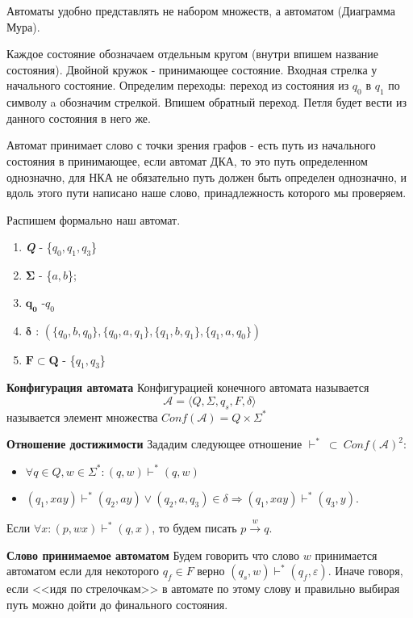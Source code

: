 Автоматы удобно представлять не набором множеств, а автоматом (Диаграмма Мура).

Каждое состояние обозначаем отдельным кругом (внутри впишем название состояния). Двойной кружок - принимающее состояние. Входная стрелка у начального состояние. Определим переходы: переход из состояния из $q_0$ в $q_1$ по символу a обозначим стрелкой. Впишем обратный переход. Петля будет вести из данного состояния в него же.

Автомат принимает слово с точки зрения графов - есть путь из начального состояния в принимающее, если автомат ДКА, то это путь определенном однозначно, для НКА не обязательно путь должен быть определен однозначно, и вдоль этого пути написано наше слово, принадлежность которого мы проверяем.

Распишем формально наш автомат.
\begin{enumerate}
    \item {\bfseries\itshape{Q}} - \{$q_0, q_1, q_3$\}
    \item $\boldsymbol{\Sigma}$ - \{$a,b$\};
    \item $\boldsymbol{q_0}$ -$q_0$
    \item $\boldsymbol{\delta}$ : $(\{q_0,b,q_0\}, \{q_0,a,q_1\},\{q_1,b,q_1\},\{q_1,a,q_0\})$
    \item $\boldsymbol{F} \subset \boldsymbol{Q}$ - \{$q_1,q_3$\}
\end{enumerate}

\textbf{Конфигурация автомата}
Конфигурацией конечного автомата называется $$\mathcal{A} = \langle Q, \Sigma, q_s, F, \delta\rangle$$ называется элемент множества $Conf(\mathcal{A}) = Q\times \Sigma^*$

\textbf{Отношение достижимости}
Зададим следующее отношение $\vdash^* \ \subset \ Conf(\mathcal{A})^2$:
\begin{itemize}
    \item $\forall q \in Q, w \in \Sigma^*: (q, w) \vdash^* (q, w)$
    \item $(q_1, xay) \vdash^* (q_2, ay) \vee (q_2, a, q_3) \in \delta \Rightarrow (q_1, xay) \vdash^* (q_3, y).$
\end{itemize}
Если $\forall x: (p, wx) \vdash^* (q, x)$, то будем писать $p \xrightarrow{w} q$.


\textbf{Слово принимаемое автоматом}
Будем говорить что слово $w$ принимается автоматом если для некоторого $q_f \in F$ верно $(q_s, w) \vdash^* (q_f, \varepsilon)$. Иначе говоря, если <<идя по стрелочкам>> в автомате по этому слову и правильно выбирая путь можно дойти до финального состояния.

